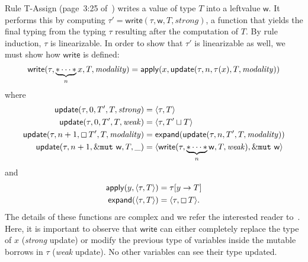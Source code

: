 Rule \textsf{T-Assign} (page~3:25 of~\cite{Pearce21}) writes a value of type
$T$ into a leftvalue $\mathsf{w}$.
It performs this by computing $\tau'=\mathsf{write}(\tau,\mathsf{w},T,\mathit{strong})$,
a function that yields the final typing from the typing $\tau$ resulting
after the computation of $T$.
By rule induction, $\tau$ is linearizable. In order to show that $\tau'$ is linearizable as well,
we must show how $\mathsf{write}$ is defined:
\[
\mathsf{write}(\tau,\underbrace{\mathtt{*}\cdots\mathtt{*}}_nx,T,\mathit{modality})=\mathsf{apply}
(x,\mathsf{update}(\tau,n,\tau(x),T,\mathit{modality}))
\]
where
\begin{align*}
  \mathsf{update}(\tau,0,T',T,\mathit{strong})&=\langle\tau,T\rangle\\
  \mathsf{update}(\tau,0,T',T,\mathit{weak})&=\langle\tau,T'\sqcup T\rangle\\
  \mathsf{update}(\tau,n+1,\boxempty\,{T'},T,\mathit{modality})
  &=\mathsf{expand}(\mathsf{update}(\tau,n,T',T,\mathit{modality}))\\
  \mathsf{update}(\tau,n+1,\&\mathtt{mut}\ \mathsf{w},T,\_)&=
  \langle\mathsf{write}(\tau,\underbrace{\mathtt{*}\cdots\mathtt{*}}_n\mathsf{w},T,\mathit{weak}),
  \&\mathtt{mut}\ \mathsf{w}\rangle
\end{align*}
and
\begin{align*}
  \mathsf{apply}(y,\langle\tau,T\rangle)&=\tau[y\to T]\\
  \mathsf{expand}(\langle\tau,T\rangle)&=\langle\tau,\boxempty\,{T}\rangle.
\end{align*}
%
The details of these functions
are complex and we refer the interested reader to~\cite{Pearce21}.
Here, it is important to observe that $\mathsf{write}$
can either completely replace the type of $x$
(\emph{strong} update) or modify the previous type of variables
inside the mutable borrows in $\tau$ (\emph{weak} update).
No other variables can see their type updated.

